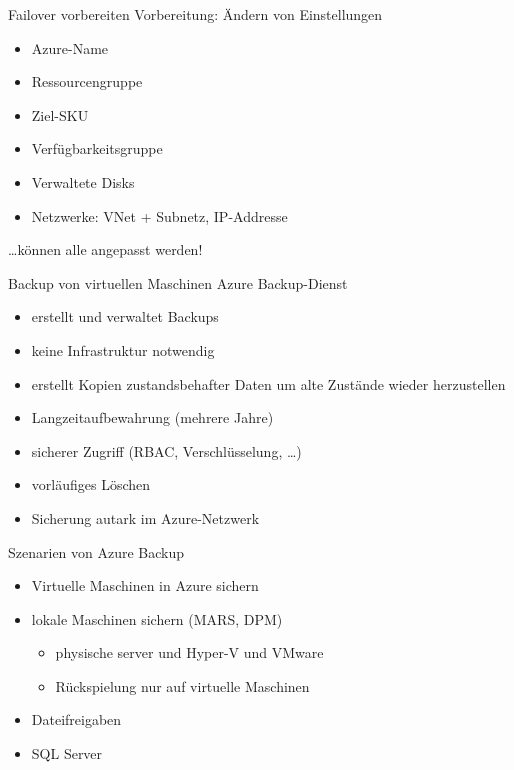 \begin{flashcard}[Definition]{Failover vorbereiten}
    Vorbereitung: Ändern von Einstellungen
    \begin{itemize}
        \item Azure-Name
        \item Ressourcengruppe
        \item Ziel-SKU
        \item Verfügbarkeitsgruppe
        \item Verwaltete Disks
        \item Netzwerke: VNet + Subnetz, IP-Addresse
    \end{itemize}
    \ldots können alle angepasst werden!
\end{flashcard}

\begin{flashcard}[Definition]{Backup von virtuellen Maschinen}
    Azure Backup-Dienst
    \begin{itemize}
        \item erstellt und verwaltet Backups
        \item keine Infrastruktur notwendig
        \item erstellt Kopien zustandsbehafter Daten um alte Zustände wieder herzustellen
        \item Langzeitaufbewahrung (mehrere Jahre)
        \item sicherer Zugriff (RBAC, Verschlüsselung, \ldots)
        \item vorläufiges Löschen
        \item Sicherung autark im Azure-Netzwerk
    \end{itemize}
\end{flashcard}

\begin{flashcard}[Definition]{Szenarien von Azure Backup}
    \begin{itemize}
        \item Virtuelle Maschinen in Azure sichern
        \item lokale Maschinen sichern (MARS, DPM)
            \begin{itemize}
                \item physische server und Hyper-V und VMware
                \item Rückspielung nur auf virtuelle Maschinen
            \end{itemize}
        \item Dateifreigaben
        \item SQL Server
    \end{itemize}
\end{flashcard}

